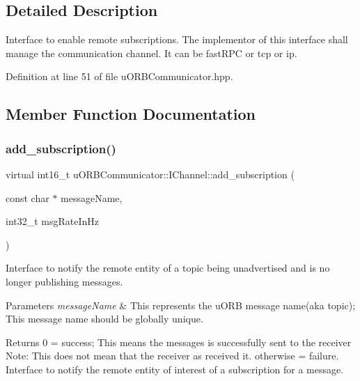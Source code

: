 \subsection{Detailed Description}
Interface to enable remote subscriptions. The implementor of this interface shall manage the communication channel. It can be fast\+R\+PC or tcp or ip. 

Definition at line 51 of file u\+O\+R\+B\+Communicator.\+hpp.



\subsection{Member Function Documentation}
\mbox{\label{classuORBCommunicator_1_1IChannel_a2fdcab300f1c9ccf8c43858493ca9358}} 
\subsubsection{\texorpdfstring{add\+\_\+subscription()}{add\_subscription()}}
{\footnotesize\ttfamily virtual int16\+\_\+t u\+O\+R\+B\+Communicator\+::\+I\+Channel\+::add\+\_\+subscription (\begin{DoxyParamCaption}\item[{const char $\ast$}]{message\+Name,  }\item[{int32\+\_\+t}]{msg\+Rate\+In\+Hz }\end{DoxyParamCaption})\hspace{0.3cm}{\ttfamily [pure virtual]}}



Interface to notify the remote entity of a topic being unadvertised and is no longer publishing messages. 


\begin{DoxyParams}{Parameters}
{\em message\+Name} & This represents the u\+O\+RB message name(aka topic); This message name should be globally unique. \\
\hline
\end{DoxyParams}
\begin{DoxyReturn}{Returns}
0 = success; This means the messages is successfully sent to the receiver Note\+: This does not mean that the receiver as received it. otherwise = failure. Interface to notify the remote entity of interest of a subscription for a message.
\end{DoxyReturn}

